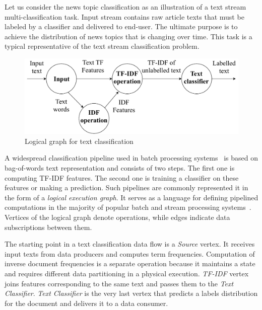 \label{fs-framework}

Let us consider the news topic classification as an illustration of a text stream multi-classification task. Input stream contains raw article texts that must be labeled by a classifier and delivered to end-user. The ultimate purpose is to achieve the distribution of news topics that is changing over time. This task is a typical representative of the text stream classification problem.

\begin{figure}[htbp]
  \centering
  \includegraphics[scale=0.32]{pics/logical-graph-no-part-fit}
  \caption{Logical graph for text classification}
  \label {logical_graph}
\end{figure}

A widespread classification pipeline used in batch processing systems~\cite{semberecki2016distributed} is based on bag-of-words text representation and consists of two steps. The first one is computing TF-IDF features. The second one is training a classifier on these features or making a prediction. Such pipelines are commonly represented it in the form of a {\em logical execution graph}. It serves as a language for defining pipelined computations in the majority of popular batch and stream processing systems~\cite{Carbone:2017:SMA:3137765.3137777, Zaharia:2016:ASU:3013530.2934664, apache:storm, Kulkarni:2015:THS:2723372.2742788, Noghabi:2017:SSS:3137765.3137770}. Vertices of the logical graph denote operations, while edges indicate data subscriptions between them. 

The starting point in a text classification data flow is a {\em Source} vertex. It receives input texts from data producers and computes term frequencies. Computation of inverse document frequencies is a separate operation because it maintains a state and requires different data partitioning in a physical execution. {\em TF-IDF} vertex joins features corresponding to the same text and passes them to the {\em Text Classifier}. {\em Text Classifier} is the very last vertex that predicts a labels distribution for the document and delivers it to a data consumer. 

